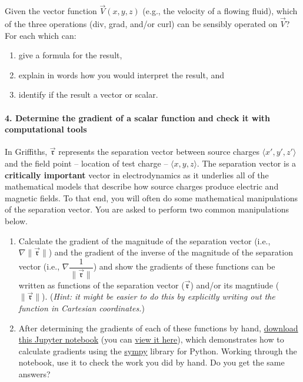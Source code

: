 \documentclass[11pt]{article}
\def\tightlist{}
\begin{document}
Given the vector function \(\vec{V}(x,y,z)\) (e.g., the velocity of a
flowing fluid), which of the three operations (div, grad, and/or curl)
can be sensibly operated on \(\vec{V}\)? For each which can:

\begin{enumerate}
\def\labelenumi{\arabic{enumi}.}
\tightlist
\item
  give a formula for the result,
\item
  explain in words how you would interpret the result, and
\item
  identify if the result a vector or scalar.
\end{enumerate}

\paragraph{4. Determine the gradient of a scalar function and check it
with computational
tools}\label{determine-the-gradient-of-a-scalar-function-and-check-it-with-computational-tools}

In Griffiths, \(\vec{\mathfrak{r}}\) represents the separation vector
between source charges \(\langle x', y', z' \rangle\) and the field
point -- location of test charge -- \(\langle x, y, z \rangle\). The
separation vector is a \textbf{critically important} vector in
electrodynamics as it underlies all of the mathematical models that
describe how source charges produce electric and magnetic fields. To
that end, you will often do some mathematical manipulations of the
separation vector. You are asked to perform two common manipulations
below.

\begin{enumerate}
\def\labelenumi{\arabic{enumi}.}
\tightlist
\item
  Calculate the gradient of the magnitude of the separation vector
  (i.e., \(\nabla\|\vec{\mathfrak{r}}\|\)) and the gradient of the
  inverse of the magnitude of the separation vector (i.e.,
  \(\nabla \dfrac{1}{\|\vec{\mathfrak{r}}\|}\)) and show the gradients
  of these functions can be written as functions of the separation
  vector (\(\vec{\mathfrak{r}}\)) and/or its magntiude
  (\(\|\vec{\mathfrak{r}}\|\)). (\emph{Hint: it might be easier to do
  this by explicitly writing out the function in Cartesian
  coordinates.})
\item
  After determining the gradients of each of these functions by hand,
  \href{../jupyter/HW1-GradientProblem.ipynb}{download this Jupyter
  notebook} (you can
  \href{https://github.com/dannycab/phy481msu/blob/gh-pages/jupyter/HW1-GradientProblem.ipynb}{view
  it here}), which demonstrates how to calculate gradients using the
  \href{http://sympy.org}{sympy} library for Python. Working through the
  notebook, use it to check the work you did by hand. Do you get the
  same answers?
\end{enumerate}
\end{document}
